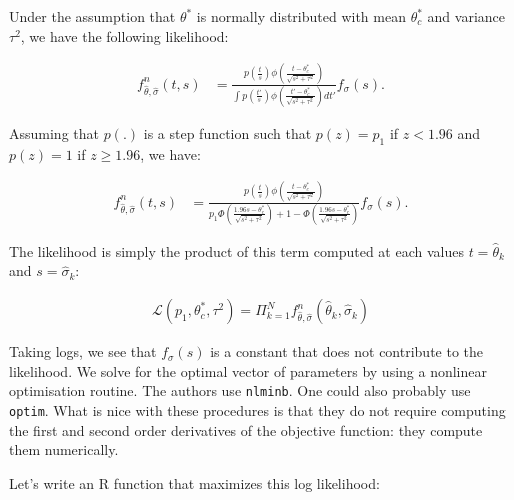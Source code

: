 \documentclass[
]{book}
\theoremstyle{definition}
\theoremstyle{definition}
\theoremstyle{definition}
\theoremstyle{definition}
\theoremstyle{remark}
\begin{document}
Under the assumption that \(\theta^*\) is normally distributed with mean \(\theta^*_c\) and variance \(\tau^2\), we have the following likelihood:

\begin{align*}
  f^n_{\hat{\theta},\hat{\sigma}}(t,s) & = \frac{p\left(\frac{t}{s}\right)\phi\left(\frac{t-\theta^*_c}{\sqrt{s^2+\tau^2}}\right)}
                                              {\int p\left(\frac{t'}{s}\right)\phi\left(\frac{t'-\theta^*_c}{\sqrt{s^2+\tau^2}}\right)dt'}f_{\sigma}(s).
\end{align*}

Assuming that \(p(.)\) is a step function such that \(p(z)=p_1\) if \(z<1.96\) and \(p(z)=1\) if \(z\geq1.96\), we have:

\begin{align*}
  f^n_{\hat{\theta},\hat{\sigma}}(t,s) & = \frac{p\left(\frac{t}{s}\right)\phi\left(\frac{t-\theta^*_c}{\sqrt{s^2+\tau^2}}\right)}
                                              {p_1\Phi\left(\frac{1.96s-\theta^*_c}{\sqrt{s^2+\tau^2}}\right)+1-\Phi\left(\frac{1.96s-\theta^*_c}{\sqrt{s^2+\tau^2}}\right)}f_{\sigma}(s).
\end{align*}

The likelihood is simply the product of this term computed at each values \(t=\hat{\theta}_k\) and \(s=\hat{\sigma}_k\):

\begin{align*}
\mathcal{L}(p_1,\theta^*_c,\tau^2)=\Pi_{k=1}^Nf^n_{\hat{\theta},\hat{\sigma}}(\hat{\theta}_k,\hat{\sigma}_k)
\end{align*}

Taking logs, we see that \(f_{\sigma}(s)\) is a constant that does not contribute to the likelihood.
We solve for the optimal vector of parameters by using a nonlinear optimisation routine.
The authors use \texttt{nlminb}.
One could also probably use \texttt{optim}.
What is nice with these procedures is that they do not require computing the first and second order derivatives of the objective function: they compute them numerically.

Let's write an R function that maximizes this log likelihood:
\end{document}
